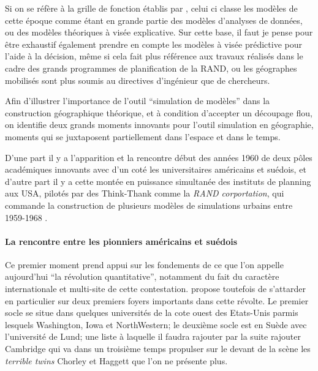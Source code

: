 Si on se réfère à la grille de fonction établis par \autocite{Varenne2014}, celui ci classe les modèles de cette époque comme étant en grande partie des modèles d'analyses de données, ou des modèles théoriques à visée explicative. Sur cette base, il faut je pense pour être exhaustif  également prendre en compte les modèles à visée prédictive pour l'aide à la décision, même si cela fait plus référence aux travaux réalisés dans le cadre des grands programmes de planification de la RAND, ou les géographes mobilisés sont plus soumis au directives d'ingénieur que de chercheurs.


Afin d'illustrer l'importance de l'outil \enquote{simulation de modèles} dans la construction géographique théorique, et à condition d'accepter un découpage flou, on identifie deux grands moments innovants pour l'outil simulation en géographie, moments qui se juxtaposent partiellement dans l'espace et dans le temps.

D'une part il y a l'apparition et la rencontre début des années 1960 de deux pôles académiques innovants avec d'un coté les universitaires américains et suédois, et d'autre part il y a cette montée en puissance simultanée des instituts de planning aux USA, pilotés par des Think-Thank comme la \textit{RAND corportation}, qui commande la construction de plusieurs modèles de simulations urbains entre 1959-1968 \autocite[307]{Batty1976}. 

\paragraph{La rencontre entre les pionniers américains et suédois}

Ce premier moment prend appui sur les fondements de ce que l'on appelle aujourd'hui \enquote{la révolution quantitative}, notamment du fait du caractère internationale et multi-site de cette contestation. \textcite{Gould2004} propose toutefois de s'attarder en particulier sur deux premiers foyers importants dans cette révolte. Le premier socle se situe dans quelques universités de la cote ouest des Etats-Unis \autocite{Gould2004} parmis lesquels Washington, Iowa et NorthWestern; le deuxième socle est en Suède avec l'université de Lund; une liste à laquelle il faudra rajouter par la suite rajouter Cambridge qui va dans un troisième temps propulser sur le devant de la scène les \textit{terrible twins} Chorley et Haggett que l'on ne présente plus.

